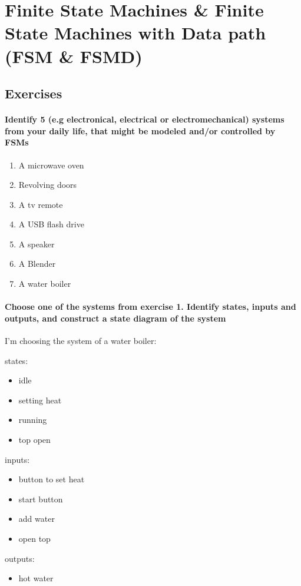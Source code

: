 \section*{Finite State Machines \& Finite State Machines with Data path (FSM \& FSMD)}

\subsection*{Exercises}
\paragraph*{Identify 5  (e.g electronical, electrical or electromechanical) systems from your daily life, that might be modeled and/or controlled by FSMs}
\begin{enumerate}
    \item A microwave oven
    \item Revolving doors
    \item A tv remote
    \item A USB flash drive
    \item A speaker
    \item A Blender
    \item A water boiler
\end{enumerate}

\paragraph*{Choose one of the systems from exercise 1. Identify states, inputs and outputs, and construct a state diagram of the system}
I'm choosing the system of a water boiler:

states:
\begin{itemize}
    \item idle
    \item setting heat
    \item running
    \item top open
\end{itemize}

inputs:
\begin{itemize}
    \item button to set heat
    \item start button
    \item add water
    \item open top
\end{itemize}

outputs:
\begin{itemize}
    \item hot water
\end{itemize}

